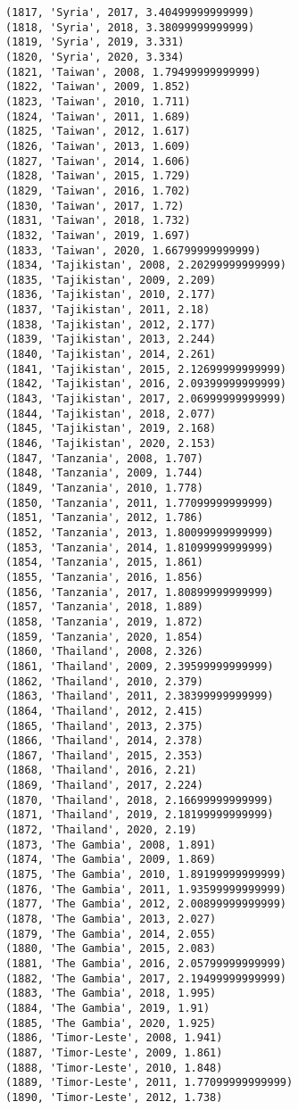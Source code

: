 \documentclass[11pt]{article}
\begin{document}
\begin{Verbatim}[commandchars=\\\{\}]
(1817, 'Syria', 2017, 3.40499999999999)
(1818, 'Syria', 2018, 3.38099999999999)
(1819, 'Syria', 2019, 3.331)
(1820, 'Syria', 2020, 3.334)
(1821, 'Taiwan', 2008, 1.79499999999999)
(1822, 'Taiwan', 2009, 1.852)
(1823, 'Taiwan', 2010, 1.711)
(1824, 'Taiwan', 2011, 1.689)
(1825, 'Taiwan', 2012, 1.617)
(1826, 'Taiwan', 2013, 1.609)
(1827, 'Taiwan', 2014, 1.606)
(1828, 'Taiwan', 2015, 1.729)
(1829, 'Taiwan', 2016, 1.702)
(1830, 'Taiwan', 2017, 1.72)
(1831, 'Taiwan', 2018, 1.732)
(1832, 'Taiwan', 2019, 1.697)
(1833, 'Taiwan', 2020, 1.66799999999999)
(1834, 'Tajikistan', 2008, 2.20299999999999)
(1835, 'Tajikistan', 2009, 2.209)
(1836, 'Tajikistan', 2010, 2.177)
(1837, 'Tajikistan', 2011, 2.18)
(1838, 'Tajikistan', 2012, 2.177)
(1839, 'Tajikistan', 2013, 2.244)
(1840, 'Tajikistan', 2014, 2.261)
(1841, 'Tajikistan', 2015, 2.12699999999999)
(1842, 'Tajikistan', 2016, 2.09399999999999)
(1843, 'Tajikistan', 2017, 2.06999999999999)
(1844, 'Tajikistan', 2018, 2.077)
(1845, 'Tajikistan', 2019, 2.168)
(1846, 'Tajikistan', 2020, 2.153)
(1847, 'Tanzania', 2008, 1.707)
(1848, 'Tanzania', 2009, 1.744)
(1849, 'Tanzania', 2010, 1.778)
(1850, 'Tanzania', 2011, 1.77099999999999)
(1851, 'Tanzania', 2012, 1.786)
(1852, 'Tanzania', 2013, 1.80099999999999)
(1853, 'Tanzania', 2014, 1.81099999999999)
(1854, 'Tanzania', 2015, 1.861)
(1855, 'Tanzania', 2016, 1.856)
(1856, 'Tanzania', 2017, 1.80899999999999)
(1857, 'Tanzania', 2018, 1.889)
(1858, 'Tanzania', 2019, 1.872)
(1859, 'Tanzania', 2020, 1.854)
(1860, 'Thailand', 2008, 2.326)
(1861, 'Thailand', 2009, 2.39599999999999)
(1862, 'Thailand', 2010, 2.379)
(1863, 'Thailand', 2011, 2.38399999999999)
(1864, 'Thailand', 2012, 2.415)
(1865, 'Thailand', 2013, 2.375)
(1866, 'Thailand', 2014, 2.378)
(1867, 'Thailand', 2015, 2.353)
(1868, 'Thailand', 2016, 2.21)
(1869, 'Thailand', 2017, 2.224)
(1870, 'Thailand', 2018, 2.16699999999999)
(1871, 'Thailand', 2019, 2.18199999999999)
(1872, 'Thailand', 2020, 2.19)
(1873, 'The Gambia', 2008, 1.891)
(1874, 'The Gambia', 2009, 1.869)
(1875, 'The Gambia', 2010, 1.89199999999999)
(1876, 'The Gambia', 2011, 1.93599999999999)
(1877, 'The Gambia', 2012, 2.00899999999999)
(1878, 'The Gambia', 2013, 2.027)
(1879, 'The Gambia', 2014, 2.055)
(1880, 'The Gambia', 2015, 2.083)
(1881, 'The Gambia', 2016, 2.05799999999999)
(1882, 'The Gambia', 2017, 2.19499999999999)
(1883, 'The Gambia', 2018, 1.995)
(1884, 'The Gambia', 2019, 1.91)
(1885, 'The Gambia', 2020, 1.925)
(1886, 'Timor-Leste', 2008, 1.941)
(1887, 'Timor-Leste', 2009, 1.861)
(1888, 'Timor-Leste', 2010, 1.848)
(1889, 'Timor-Leste', 2011, 1.77099999999999)
(1890, 'Timor-Leste', 2012, 1.738)

\end{Verbatim}
\end{document}
